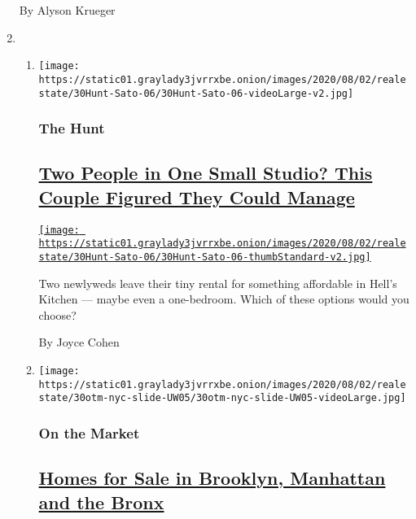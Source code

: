 \begin{enumerate}
  By Alyson Krueger
\item
  \begin{enumerate}
  \def\labelenumii{\arabic{enumii}.}
  \item
    \texttt{[image: https://static01.graylady3jvrrxbe.onion/images/2020/08/02/realestate/30Hunt-Sato-06/30Hunt-Sato-06-videoLarge-v2.jpg]}

    \hypertarget{the-hunt}{%
    \subsubsection{The Hunt}\label{the-hunt}}

    \hypertarget{two-people-in-one-small-studio-this-couple-figured-they-could-manage}{%
    \subsection{\texorpdfstring{\href{/interactive/2020/07/30/realestate/30hunt-sato.html}{Two
    People in One Small Studio? This Couple Figured They Could
    Manage}}{Two People in One Small Studio? This Couple Figured They Could Manage}}\label{two-people-in-one-small-studio-this-couple-figured-they-could-manage}}

    \href{/interactive/2020/07/30/realestate/30hunt-sato.html}{\texttt{[image: https://static01.graylady3jvrrxbe.onion/images/2020/08/02/realestate/30Hunt-Sato-06/30Hunt-Sato-06-thumbStandard-v2.jpg]}}

    Two newlyweds leave their tiny rental for something affordable in
    Hell's Kitchen --- maybe even a one-bedroom. Which of these options
    would you choose?

    By Joyce Cohen
  \item
    \texttt{[image: https://static01.graylady3jvrrxbe.onion/images/2020/08/02/realestate/30otm-nyc-slide-UW05/30otm-nyc-slide-UW05-videoLarge.jpg]}

    \hypertarget{on-the-market}{%
    \subsubsection{On the Market}\label{on-the-market}}

    \hypertarget{homes-for-sale-in-brooklyn-manhattan-and-the-bronx}{%
    \subsection{\texorpdfstring{\href{/2020/07/30/realestate/homes-for-sale-in-brooklyn-manhattan-and-the-bronx.html}{Homes
    for Sale in Brooklyn, Manhattan and the
    Bronx}}{Homes for Sale in Brooklyn, Manhattan and the Bronx}}\label{homes-for-sale-in-brooklyn-manhattan-and-the-bronx}}


\end{enumerate}
\end{enumerate}

